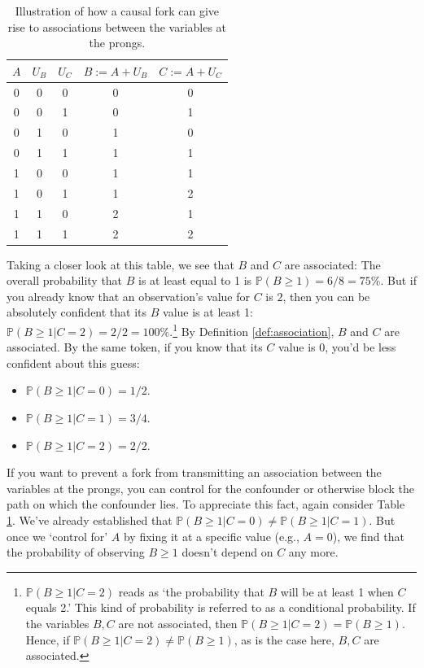 \documentclass[a4paper]{tufte-book}\usepackage[]{graphicx}\usepackage[]{xcolor}
\begin{document}
\begin{table}
\centering
\begin{tabular}{ccccc}
  \toprule
  $A$ & $U_B$ & $U_C$ & $B := A + U_B$ & $C := A + U_C$ \\
  \midrule
  0   & 0     & 0     & 0   & 0 \\
  0   & 0     & 1     & 0   & 1 \\
  0   & 1     & 0     & 1   & 0 \\
  0   & 1     & 1     & 1   & 1 \\
  \midrule
  1   & 0     & 0     & 1   & 1 \\
  1   & 0     & 1     & 1   & 2 \\
  1   & 1     & 0     & 2   & 1 \\
  1   & 1     & 1     & 2   & 2 \\
  \bottomrule
\end{tabular}
\caption{Illustration of how a causal fork can give rise to associations between the variables at the prongs.}
\label{tab:illustration_fork}
\end{table}

Taking a closer look at this table, we see that $B$ and $C$ are associated:
The overall probability that $B$ is at least equal to 1 is $\mathbb{P}(B \geq 1) = 6/8 = 75\%$. But if you already know
that an observation's value for $C$ is $2$, then you can be absolutely confident
that its $B$ value is at least 1: $\mathbb{P}(B \geq 1 | C = 2) = 2/2 = 100\%$.\footnote{$\mathbb{P}(B \geq 1 | C = 2)$ reads
as `the probability that $B$ will be at least 1 when $C$ equals 2.'
This kind of probability is referred to as a conditional probability.
If the variables $B, C$ are not associated, then $\mathbb{P}(B \geq 1 | C = 2) = \mathbb{P}(B \geq 1)$.
Hence, if $\mathbb{P}(B \geq 1 | C = 2) \neq \mathbb{P}(B \geq 1)$, as is the case here, $B, C$ are associated.}
By Definition \ref{def:association}, $B$ and $C$ are associated.
By the same token, if you know that its $C$ value
is $0$, you'd be less confident about this guess:

\begin{itemize}
 \item $\mathbb{P}(B \geq 1 | C = 0) = 1/2.$
 \item $\mathbb{P}(B \geq 1 | C = 1) = 3/4.$
 \item $\mathbb{P}(B \geq 1 | C = 2) = 2/2.$
\end{itemize}

If you want to prevent a fork from transmitting an association between the variables
at the prongs, you can control for the confounder or otherwise block the path on which
the confounder lies.
To appreciate this fact, again consider Table \ref{tab:illustration_fork}. We've already
established that $\mathbb{P}(B \geq 1 | C = 0) \neq \mathbb{P}(B \geq 1 | C = 1)$. But once
we `control for' $A$ by fixing it at a specific value (e.g., $A = 0$), we find
that the probability of observing $B \geq 1$ doesn't depend on $C$ any more.
\end{document}

